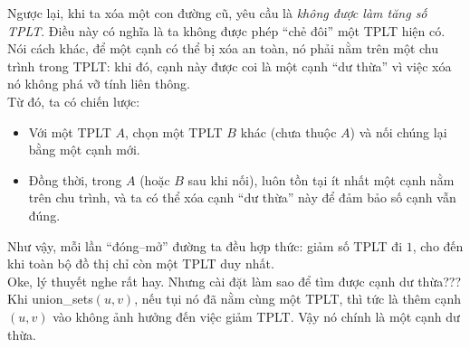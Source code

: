 \documentclass{article}
\begin{document}
Ngược lại, khi ta xóa một con đường cũ, yêu cầu là \textit{không được làm tăng số TPLT}. 
Điều này có nghĩa là ta không được phép ``chẻ đôi'' một TPLT hiện có. 
Nói cách khác, để một cạnh có thể bị xóa an toàn, nó phải nằm trên một chu trình trong TPLT: 
khi đó, cạnh này được coi là một cạnh ``dư thừa'' vì việc xóa nó không phá vỡ tính liên thông. \\

Từ đó, ta có chiến lược: 
\begin{itemize}
    \item Với một TPLT $A$, chọn một TPLT $B$ khác (chưa thuộc $A$) và nối chúng lại bằng một cạnh mới.
    \item Đồng thời, trong $A$ (hoặc $B$ sau khi nối), luôn tồn tại ít nhất một cạnh nằm trên chu trình, 
    và ta có thể xóa cạnh ``dư thừa'' này để đảm bảo số cạnh vẫn đúng.
\end{itemize}

Như vậy, mỗi lần ``đóng–mở'' đường ta đều hợp thức: giảm số TPLT đi $1$, 
cho đến khi toàn bộ đồ thị chỉ còn một TPLT duy nhất. \\

Oke, lý thuyết nghe rất hay. Nhưng cài đặt làm sao để tìm được cạnh dư thừa??? Khi union\_sets$(u, v)$, nếu tụi nó đã nằm cùng một TPLT, thì tức là thêm cạnh $(u, v)$ vào không ảnh hưởng đến việc giảm TPLT. Vậy nó chính là một cạnh dư thừa.
\end{document}
